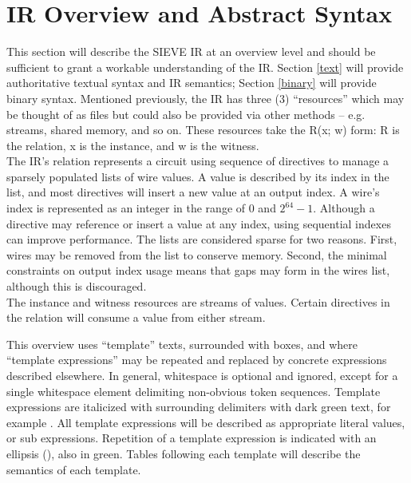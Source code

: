 \newpage
\section{IR Overview and Abstract Syntax}\label{overview}
This section will describe the SIEVE IR at an overview level and should be sufficient to grant a workable understanding of the IR.
Section \ref{text} will provide authoritative textual syntax and IR semantics; Section \ref{binary} will provide binary syntax.
Mentioned previously, the IR has three (3) ``resources'' which may be thought of as files but could also be provided via other methods -- e.g. streams, shared memory, and so on.
These resources take the R(x; w) form: R is the relation, x is the instance, and w is the witness. \\

The IR's relation represents a circuit using sequence of directives to manage a sparsely populated lists of wire values.
A value is described by its index in the list, and most directives will insert a new value at an output index.
A wire's index is represented as an integer in the range of $0$ and $2^{64}-1$.
Although a directive may reference or insert a value at any index, using sequential indexes can improve performance.
The lists are considered sparse for two reasons. 
First, wires may be removed from the list to conserve memory.
Second, the minimal constraints on output index usage means that gaps may form in the wires list, although this is discouraged.\\

The instance and witness resources are streams of values.
Certain directives in the relation will consume a value from either stream.\\

\lstset{language=ir}
\lstset{frame=single}
\lstset{escapechar=\#}

\newcommand{\asTemplate}[1]{{\color{SyntaxGreen}{\textit{\{\texttt{#1}\}}}}}
\newcommand{\asRepeat}[0]{{\color{SyntaxGreen}{...}}}

This overview uses ``template'' texts, surrounded with boxes, and where ``template expressions'' may be repeated and replaced by concrete expressions described elsewhere.
In general, whitespace is optional and ignored, except for a single whitespace element delimiting non-obvious token sequences.
Template expressions are italicized with surrounding delimiters with dark green text, for example \asTemplate{expression}.
All template expressions will be described as appropriate literal values, or sub expressions.
Repetition of a template expression is indicated with an ellipsis (\asRepeat), also in green.
Tables following each template will describe the semantics of each template.\\

